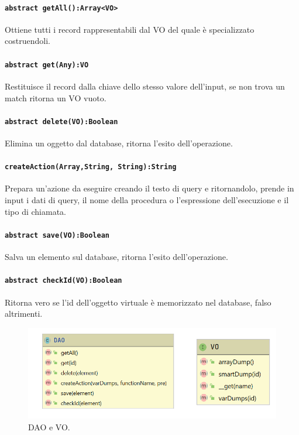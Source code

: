 \documentclass[12pt, a4paper]{article}
\begin{document}
    \paragraph{\texttt{abstract getAll():Array<VO>}} Ottiene tutti i record rappresentabili dal VO del quale è specializzato costruendoli.
    \paragraph{\texttt{abstract get(Any):VO}} Restituisce il record dalla chiave dello stesso valore dell'input, se non trova un match ritorna un VO vuoto.
    \paragraph{\texttt{abstract delete(VO):Boolean}} Elimina un oggetto dal database, ritorna l'esito dell'operazione.
    \paragraph{\texttt{createAction(Array,String, String):String}} Prepara un'azione da eseguire creando il testo di query e ritornandolo, prende in input i dati di query, il nome della procedura o l'espressione dell'esecuzione e il tipo di chiamata.
    \paragraph{\texttt{abstract save(VO):Boolean}} Salva un elemento sul database, ritorna l'esito dell'operazione.
    \paragraph{\texttt{abstract checkId(VO):Boolean}} Ritorna vero se l'id dell'oggetto virtuale è memorizzato nel database, falso altrimenti.

    \begin{figure}[htbp]
        \label{fig:Dao}
        \includegraphics[scale=0.6]{DAO.png}

        \caption{DAO e VO.}
    \end{figure}
\end{document}
